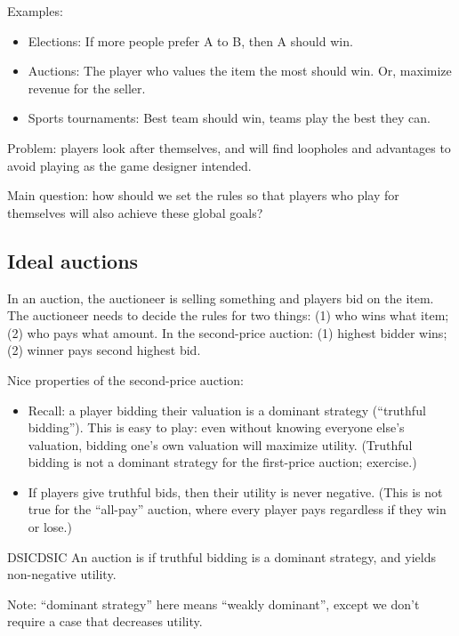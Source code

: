\documentclass[12pt,letterpaper]{report}
\begin{document}
Examples:
\begin{itemize}
  \item
  Elections: If more people prefer A to B, then A should win.
  \item
  Auctions: The player who values the item the most should win.
  Or, maximize revenue for the seller.
  \item
  Sports tournaments: Best team should win, teams play the best they can.
\end{itemize}

Problem: players look after themselves, and will find loopholes and advantages to avoid playing as
the game designer intended.

Main question: how should we set the rules so that players who play for themselves will also achieve
these global goals?

\subsection{Ideal auctions}

In an auction, the auctioneer is selling something and players bid on the item.
The auctioneer needs to decide the rules for two things: (1) who wins what item; (2) who pays what
amount.
In the second-price auction: (1) highest bidder wins; (2) winner pays second highest bid.

Nice properties of the second-price auction:
\begin{itemize}
  \item
  Recall: a player bidding their valuation is a dominant strategy (``truthful bidding'').
  This is easy to play: even without knowing everyone else's valuation, bidding one's own valuation
  will maximize utility.
  (Truthful bidding is not a dominant strategy for the first-price auction; exercise.)
  \item
  If players give truthful bids, then their utility is never negative.
  (This is not true for the ``all-pay'' auction, where every player pays regardless if they win or
  lose.)
\end{itemize}

\begin{defn}{DSIC}{DSIC}
  An auction is  if truthful bidding is a
  dominant strategy, and yields non-negative utility.
\end{defn}

Note: ``dominant strategy'' here means ``weakly dominant'', except we don't require a case that
decreases utility.
\end{document}
